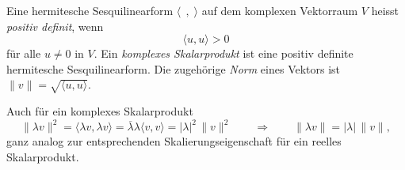 \begin{definition}
Eine hermitesche Sesquilinearform $\langle\;\,,\;\rangle$
auf dem komplexen Vektorraum $V$ heisst {\em positiv definit}, wenn
\[
\langle u,u\rangle > 0
\]
für alle $u\ne 0$ in $V$.
Ein {\em komplexes Skalarprodukt} ist eine positiv definite hermitesche
Sesquilinearform.
Die zugehörige {\em Norm} eines Vektors ist
$\|v\| = \sqrt{\langle u, u\rangle}$.
\end{definition}

Auch für ein komplexes Skalarprodukt
\[
\|\lambda v\|^2
=
\langle \lambda v,\lambda v\rangle
=
\overline{\lambda}\lambda\langle v,v\rangle
=
|\lambda|^2\,\|v\|^2
\qquad\Rightarrow\qquad
\|\lambda v\|
=
|\lambda|\, \|v\|,
\]
ganz analog zur entsprechenden Skalierungseigenschaft für ein
reelles Skalarprodukt.





